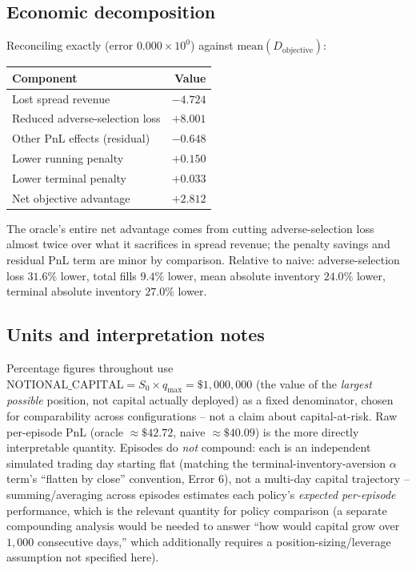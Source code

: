 \documentclass[11pt]{article}
\begin{document}
\subsection{Economic decomposition}
Reconciling exactly (error $0.000\times10^{0}$) against $\text{mean}(D_{\text{objective}})$:
\begin{center}
\begin{tabular}{@{}lr@{}}
\toprule
Component & Value \\
\midrule
Lost spread revenue & $-4.724$ \\
Reduced adverse-selection loss & $+8.001$ \\
Other PnL effects (residual) & $-0.648$ \\
Lower running penalty & $+0.150$ \\
Lower terminal penalty & $+0.033$ \\
\midrule
Net objective advantage & $+2.812$ \\
\bottomrule
\end{tabular}
\end{center}
The oracle's entire net advantage comes from cutting adverse-selection loss almost twice over what it sacrifices in spread revenue; the penalty savings and residual PnL term are minor by comparison. Relative to naive: adverse-selection loss $31.6\%$ lower, total fills $9.4\%$ lower, mean absolute inventory $24.0\%$ lower, terminal absolute inventory $27.0\%$ lower.

\subsection{Units and interpretation notes}
Percentage figures throughout use $\text{NOTIONAL\_CAPITAL} = S_0 \times q_{\max} = \$1{,}000{,}000$ (the value of the \emph{largest possible} position, not capital actually deployed) as a fixed denominator, chosen for comparability across configurations -- not a claim about capital-at-risk. Raw per-episode PnL (oracle $\approx\$42.72$, naive $\approx\$40.09$) is the more directly interpretable quantity. Episodes do \emph{not} compound: each is an independent simulated trading day starting flat (matching the terminal-inventory-aversion $\alpha$ term's ``flatten by close'' convention, Error 6), not a multi-day capital trajectory -- summing/averaging across episodes estimates each policy's \emph{expected per-episode} performance, which is the relevant quantity for policy comparison (a separate compounding analysis would be needed to answer ``how would capital grow over $1{,}000$ consecutive days,'' which additionally requires a position-sizing/leverage assumption not specified here).
\end{document}
